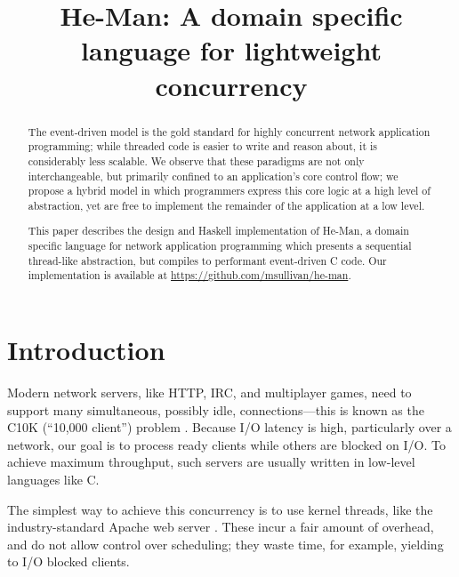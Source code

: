 \documentclass[preprint]{sigplanconf}
\title{He-Man: A domain specific language for lightweight concurrency}
\begin{document}
\maketitle


\begin{abstract}
The event-driven model is the gold standard for highly concurrent network
application programming; while threaded code is easier to write and reason
about, it is considerably less scalable. We observe that these paradigms are not
only interchangeable, but primarily confined to an application's core control
flow; we propose a hybrid model in which programmers express this core logic at
a high level of abstraction, yet are free to implement the remainder of the
application at a low level.

This paper describes the design and Haskell implementation of He-Man, a domain
specific language for network application programming which presents a
sequential thread-like abstraction, but compiles to performant event-driven C
code. Our implementation is available at
\url{https://github.com/msullivan/he-man}. %
\end{abstract}




\section{Introduction}

Modern network servers, like HTTP, IRC, and multiplayer games, need to support
many simultaneous, possibly idle, connections---this is known as the C10K
(``10,000 client'') problem \cite{Kegel}. Because I/O latency is high,
particularly over a network, our goal is to process ready clients while others
are blocked on I/O. To achieve maximum throughput, such servers are usually
written in low-level languages like C.

The simplest way to achieve this concurrency is to use kernel threads, like the
industry-standard Apache web server \cite{Apache}. These incur a fair amount of
overhead, and do not allow control over scheduling; they waste time, for
example, yielding to I/O blocked clients.
\end{document}
